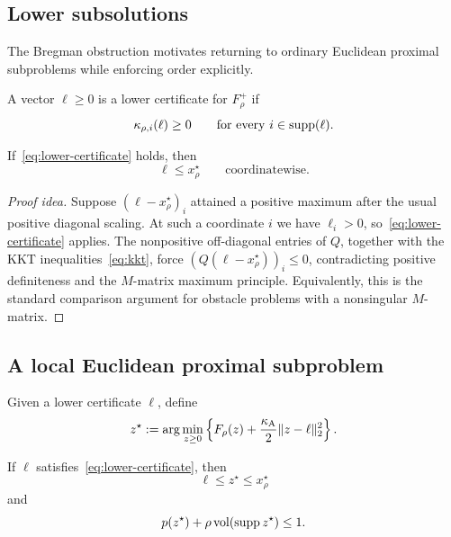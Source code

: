 \subsection{Lower subsolutions}

The Bregman obstruction motivates returning to ordinary Euclidean proximal
subproblems while enforcing order explicitly.

\begin{definition}
A vector $\ell\ge0$ is a lower certificate for $F_\rho^+$ if
\begin{equation}
 \kappa_{\rho,i}(\ell)\ge0
 \qquad\text{for every }i\in\operatorname{supp}(\ell).
 \label{eq:lower-certificate}
\end{equation}
\end{definition}

\begin{lemma}
\label{lem:lower-comparison}
If~\eqref{eq:lower-certificate} holds, then
\begin{equation}
  \ell\le x_\rho^\star
  \qquad\text{coordinatewise}.
  \label{eq:lower-order}
\end{equation}
\end{lemma}

\begin{proof}[Proof idea]
Suppose $(\ell-x_\rho^\star)_i$ attained a positive maximum after the usual
positive diagonal scaling.  At such a coordinate $i$ we have $\ell_i>0$,
so~\eqref{eq:lower-certificate} applies.  The nonpositive off-diagonal entries
of $Q$, together with the KKT inequalities~\eqref{eq:kkt}, force
$(Q(\ell-x_\rho^\star))_i\le0$, contradicting positive definiteness and the
$M$-matrix maximum principle.  Equivalently, this is the standard comparison
argument for obstacle problems with a nonsingular $M$-matrix.
\end{proof}

\subsection{A local Euclidean proximal subproblem}

Given a lower certificate $\ell$, define
\begin{equation}
 z^\star
 :=\arg\min_{z\ge0}
 \left\{F_\rho(z)
 +\frac{\kappa_{\mathrm A}}{2}\lVert z-\ell\rVert_2^2\right\}.
 \label{eq:safe-euclidean-prox}
\end{equation}

\begin{theorem}
\label{thm:safe-euclidean-center}
If $\ell$ satisfies~\eqref{eq:lower-certificate}, then
\begin{equation}
  \ell\le z^\star\le x_\rho^\star
  \label{eq:prox-sandwich}
\end{equation}
and
\begin{equation}
  p(z^\star)+\rho\operatorname{vol}(\operatorname{supp} z^\star)\le1.
  \label{eq:euclidean-prox-budget}
\end{equation}
\end{theorem}

